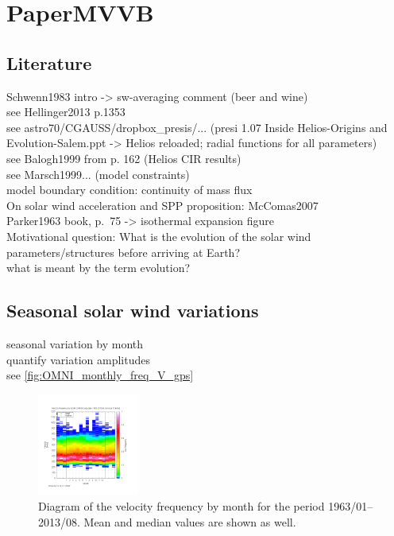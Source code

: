 
\chapter{PaperMVVB}



\section{Literature}
Schwenn1983 intro -> sw-averaging comment (beer and wine)\\
see Hellinger2013 p.1353\\
see astro70/CGAUSS/dropbox\_presis/... (presi 1.07 Inside Helios-Origins and Evolution-Salem.ppt -> Helios reloaded; radial functions for all parameters)\\
see Balogh1999 from p. 162 (Helios CIR results)\\
see Marsch1999... (model constraints)\\
model boundary condition: continuity of mass flux\\
On solar wind acceleration and SPP proposition: McComas2007\\
Parker1963 book, p.~75 -> isothermal expansion figure\\	%

Motivational question: What is the evolution of the solar wind parameters/structures before arriving at Earth?\\
what is meant by the term evolution?\\


\section{Seasonal solar wind variations}
seasonal variation by month\\
quantify variation amplitudes\\

see \autoref{fig:OMNI_monthly_freq_V_gps}
\begin{figure}[htb]
	\centering
	\includegraphics[width=0.3\textwidth]{images/gnuplots/OMNI_monthly_freq_V_gps.png}
	\caption{Diagram of the velocity frequency by month for the period 1963/01--2013/08. Mean and median values are shown as well.}
	\label{fig:OMNI_monthly_freq_V_gps}
\end{figure}

